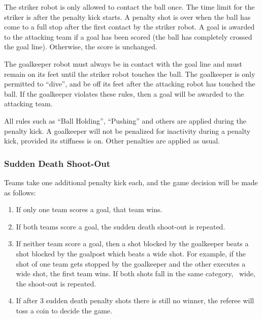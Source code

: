 The striker robot is only allowed to contact the ball once.
The time limit for the striker is \PenaltyKickTime after the penalty kick starts.
A penalty shot is over when the ball has come to a full stop after the first contact by the striker robot.
A goal is awarded to the attacking team if a goal has been scored (\ie the ball has completely crossed the goal line).
Otherwise, the score is unchanged.

The goalkeeper robot must always be in contact with the goal line and must remain on its feet until the striker robot touches the ball.
The goalkeeper is only permitted to ``dive'', and be off its feet after the attacking robot has touched the ball.
If the goalkeeper violates these rules, then a goal will be awarded to the attacking team.

All rules such as ``Ball Holding'', ``Pushing'' and others are applied during the penalty kick.
A goalkeeper will not be penalized for inactivity during a penalty kick, provided its stiffness is on.
Other penalties are applied as usual.

\subsubsection{Sudden Death Shoot-Out}
\label{sec:sudden_death_shoot_out}

Teams take one additional penalty kick each, and the game decision will be made as follows:

\begin{enumerate}
  \item If only one team scores a goal, that team wins.
  \item If both teams score a goal, the sudden death shoot-out is repeated.
  \item If neither team score a goal, then a shot blocked by the goalkeeper beats a shot blocked by the goalpost which beats a wide shot. For example, if the shot of one team gets stopped by the goalkeeper and the other executes a wide shot, the first team wins. If both shots fall in the same category, \eg~wide, the shoot-out is repeated.
  \item If after 3 sudden death penalty shots there is still no winner, the referee will toss a coin to decide the game.
\end{enumerate}
